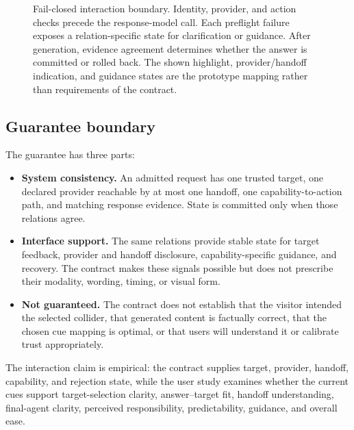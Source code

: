 \begin{figure}[t]
  \caption{Fail-closed interaction boundary.  Identity, provider, and action
  checks precede the response-model call.  Each preflight failure exposes a
  relation-specific state for clarification or guidance.  After generation,
  evidence agreement determines whether the answer is committed or rolled back.
  The shown highlight, provider/handoff indication, and guidance states are the
  prototype mapping rather than requirements of the contract.}
  \label{fig:admission-boundary}
\end{figure}

\subsection{Guarantee boundary}

The guarantee has three parts:

\begin{itemize}
  \item \textbf{System consistency.}  An admitted request has one trusted
  target, one declared provider reachable by at most one handoff, one
  capability-to-action path, and matching response evidence.  State is committed
  only when those relations agree.

  \item \textbf{Interface support.}  The same relations provide stable state for
  target feedback, provider and handoff disclosure, capability-specific
  guidance, and recovery.  The contract makes these signals possible but does
  not prescribe their modality, wording, timing, or visual form.

  \item \textbf{Not guaranteed.}  The contract does not establish that the
  visitor intended the selected collider, that generated content is factually
  correct, that the chosen cue mapping is optimal, or that users will understand
  it or calibrate trust appropriately.
\end{itemize}

The interaction claim is empirical: the contract supplies target, provider,
handoff, capability, and rejection state, while the user study examines whether
the current cues support target-selection clarity, answer--target fit, handoff
understanding, final-agent clarity, perceived responsibility, predictability,
guidance, and overall ease.
